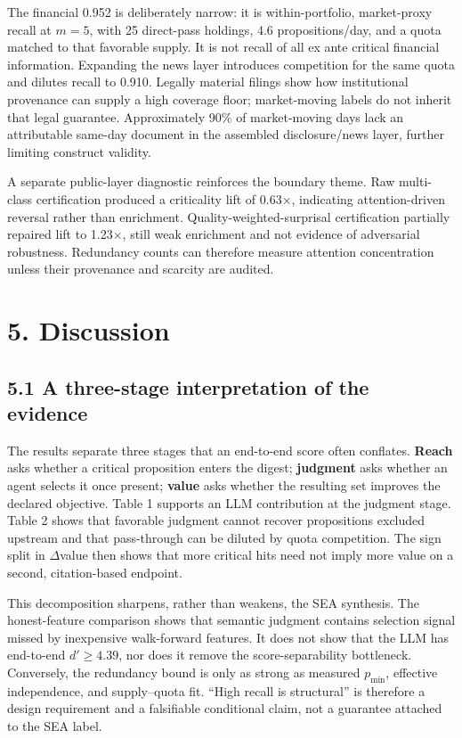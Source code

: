 \documentclass[
  conference,10pt]{IEEEtran}
\begin{document}
The financial 0.952 is deliberately narrow: it is within-portfolio, market-proxy recall at \(m=5\), with 25 direct-pass holdings, 4.6 propositions/day, and a quota matched to that favorable supply. It is not recall of all ex ante critical financial information. Expanding the news layer introduces competition for the same quota and dilutes recall to 0.910. Legally material filings show how institutional provenance can supply a high coverage floor; market-moving labels do not inherit that legal guarantee. Approximately 90\% of market-moving days lack an attributable same-day document in the assembled disclosure/news layer, further limiting construct validity.

A separate public-layer diagnostic reinforces the boundary theme. Raw multi-class certification produced a criticality lift of 0.63×, indicating attention-driven reversal rather than enrichment. Quality-weighted-surprisal certification partially repaired lift to 1.23×, still weak enrichment and not evidence of adversarial robustness. Redundancy counts can therefore measure attention concentration unless their provenance and scarcity are audited.

\section{5. Discussion}\label{discussion}

\subsection{5.1 A three-stage interpretation of the evidence}\label{a-three-stage-interpretation-of-the-evidence}

The results separate three stages that an end-to-end score often conflates. \textbf{Reach} asks whether a critical proposition enters the digest; \textbf{judgment} asks whether an agent selects it once present; \textbf{value} asks whether the resulting set improves the declared objective. Table 1 supports an LLM contribution at the judgment stage. Table 2 shows that favorable judgment cannot recover propositions excluded upstream and that pass-through can be diluted by quota competition. The sign split in \(\Delta\)value then shows that more critical hits need not imply more value on a second, citation-based endpoint.

This decomposition sharpens, rather than weakens, the SEA synthesis. The honest-feature comparison shows that semantic judgment contains selection signal missed by inexpensive walk-forward features. It does not show that the LLM has end-to-end \(d'\ge4.39\), nor does it remove the score-separability bottleneck. Conversely, the redundancy bound is only as strong as measured \(p_{\min}\), effective independence, and supply--quota fit. ``High recall is structural'' is therefore a design requirement and a falsifiable conditional claim, not a guarantee attached to the SEA label.
\end{document}
